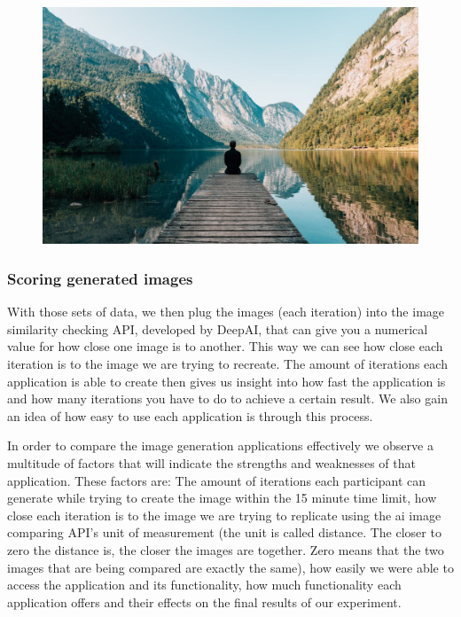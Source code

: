 \documentclass[]{report}
\begin{document}
	\begin{figure}[!h]
		\centering
		\includegraphics[width=1\linewidth]{OG}
		\caption{}
		\label{fig:og}
	\end{figure}
	
	\subsubsection{Scoring generated images}
	With those sets of data, we then plug the images (each iteration) into the image similarity checking API, developed by DeepAI, that can give you a numerical value for how close one image is to another. This way we can see how close each iteration is to the image we are trying to recreate. The amount of iterations each application is able to create then gives us insight into how fast the application is and how many iterations you have to do to achieve a certain result. We also gain an idea of how easy to use each application is through this process.
	
	In order to compare the image generation applications effectively we observe a multitude of factors that will indicate the strengths and weaknesses of that application. These factors are: The amount of iterations each participant can generate while trying to create the image within the 15 minute time limit, how close each iteration is to the image we are trying to replicate using the ai image comparing API's unit of measurement (the unit is called distance. The closer to zero the distance is, the closer the images are together. Zero means that the two images that are being compared are exactly the same), how easily we were able to access the application and its functionality, how much functionality each application offers and their effects on the final results of our experiment.
	
\end{document}
